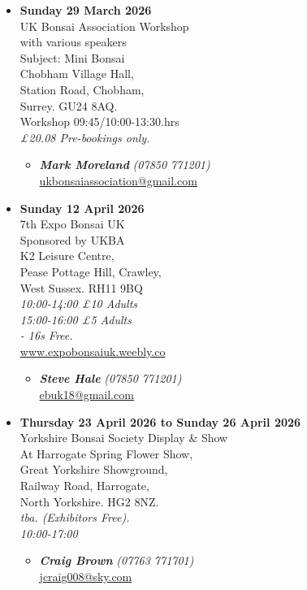 \begin{itemize}
    \item \textbf{Sunday 29 March 2026}
    \\
    UK Bonsai Association Workshop \\
    with various speakers \\
    Subject: Mini Bonsai \\
    Chobham Village Hall, \\
    Station Road, Chobham, \\
    Surrey. GU24 8AQ. \\
    Workshop 09:45/10:00-13:30.hrs
    \\
    \emph{£20.08 Pre-bookings only.}
    \begin{itemize}
        \item \textbf{\emph{Mark Moreland}} \emph{(07850 771201)} \\
        \href{mailto:ukbonsaiassociation@gmail.com}{ukbonsaiassociation@gmail.com} 
    \end{itemize}

    \item \textbf{Sunday 12 April 2026}
    \\
    7th Expo Bonsai UK \\
    Sponsored by UKBA \\
    K2 Leisure Centre, \\
    Pease Pottage Hill, Crawley, \\
    West Sussex. RH11 9BQ
    \\
    \emph{10:00-14:00 £10 Adults} \\
    \emph{15:00-16:00 £5 Adults} \\
    \emph{- 16s Free.}
    \\
    \href{http://www.expobonsaiuk.weebly.co/}{www.expobonsaiuk.weebly.co}
    \begin{itemize}
        \item \textbf{\emph{Steve Hale}} \emph{(07850 771201)} \\
        \href{mailto:ebuk18@gmail.com}{ebuk18@gmail.com} 
    \end{itemize}

    \item \textbf{Thursday 23 April 2026 to Sunday 26 April 2026}
    \\
    Yorkshire Bonsai Society Display \& Show \\
    At Harrogate Spring Flower Show, \\
    Great Yorkshire Showground, \\
    Railway Road, Harrogate, \\
    North Yorkshire. HG2 8NZ.
    \\
    \emph{tba. (Exhibitors Free).} \\
    \emph{10:00-17:00}
    \begin{itemize}
        \item \textbf{\emph{Craig Brown}} \emph{(07763 771701)} \\
        \href{mailto:jcraig008@sky.com}{jcraig008@sky.com} 
    \end{itemize}


\end{itemize}
